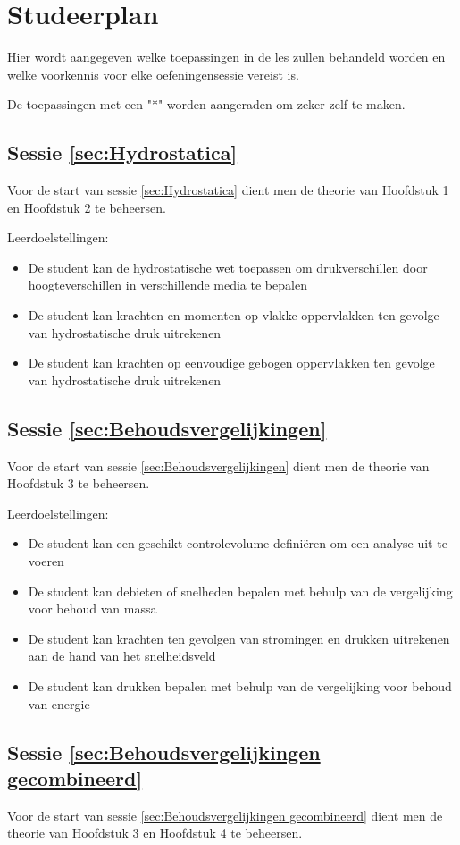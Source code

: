 \chapter{Studeerplan}
Hier wordt aangegeven welke toepassingen in de les zullen behandeld worden en welke voorkennis voor elke oefeningensessie vereist is.

De toepassingen met een "*" worden aangeraden om zeker zelf te maken.
	\section*{Sessie \ref{sec:Hydrostatica}}
Voor de start van sessie \ref{sec:Hydrostatica} dient men de theorie van Hoofdstuk 1 en Hoofdstuk 2 te beheersen.

Leerdoelstellingen:
\begin{itemize}
	\item De student kan de hydrostatische wet toepassen om drukverschillen door hoogteverschillen in verschillende media te bepalen
	\item De student kan krachten en momenten op vlakke oppervlakken ten gevolge van hydrostatische druk uitrekenen
	\item De student kan krachten op eenvoudige gebogen oppervlakken ten gevolge van hydrostatische druk uitrekenen
\end{itemize}
	
	\section*{Sessie \ref{sec:Behoudsvergelijkingen}}
Voor de start van sessie \ref{sec:Behoudsvergelijkingen} dient men de theorie van Hoofdstuk 3 te beheersen.

Leerdoelstellingen:
\begin{itemize}
	\item De student kan een geschikt controlevolume definiëren om een analyse uit te voeren
	\item De student kan debieten of snelheden bepalen met behulp van de vergelijking voor behoud van massa
	\item De student kan krachten ten gevolgen van stromingen en drukken uitrekenen aan de hand van het snelheidsveld
	\item De student kan drukken bepalen met behulp van de vergelijking voor behoud van energie
\end{itemize}

	\section*{Sessie \ref{sec:Behoudsvergelijkingen gecombineerd}}
Voor de start van sessie \ref{sec:Behoudsvergelijkingen gecombineerd} dient men de theorie van Hoofdstuk 3 en Hoofdstuk 4 te beheersen.

